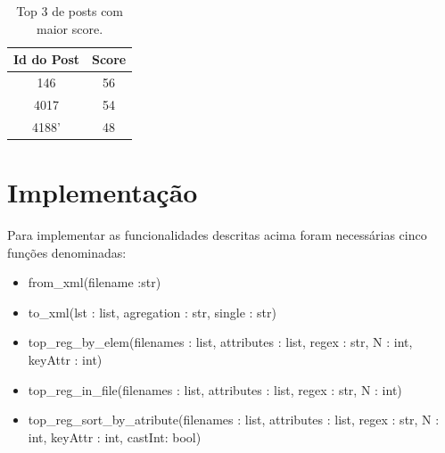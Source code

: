 \documentclass[11pt,a4paper]{report}%
\begin{document}
\begin{table}[h!] %
\begin{center} %
\begin{tabular}{ | c | c | } %
  \hline  %
  Id do Post & Score \\
  \hline
  146  & 56 \\
  4017 & 54 \\
  4188' & 48 \\
  \hline
\end{tabular}
\end{center}
\caption{Top 3 de posts com maior score.} \label{tab:top3MaisScore}
\end{table}

\newpage

\section{Implementação}

Para implementar as funcionalidades descritas acima foram necessárias cinco funções denominadas:
\begin{itemize}
    \item from\_xml(filename :str)
    \item to\_xml(lst : list, agregation : str, single : str)
    \item top\_reg\_by\_elem(filenames : list, attributes : list, regex : str, N : int, keyAttr : int)
    \item top\_reg\_in\_file(filenames : list, attributes : list, regex : str, N : int)
    \item top\_reg\_sort\_by\_atribute(filenames : list, attributes : list, regex : str, N : int, keyAttr : int, castInt: bool)
\end{itemize}{}
\end{document}
